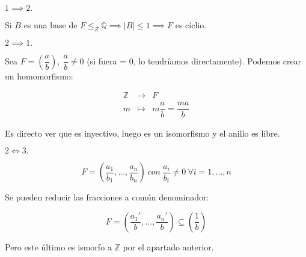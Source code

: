 \documentclass[openany]{book}
\begin{document}
\begin{exercise}
    $ $

    \noindent $ 1\implies 2.$

    Si $ B$ es una base de $ F \leq _{Z}\mathbb{Q} \implies |B| \leq  1 \implies F$ es cíclio.

    \noindent $ 2 \implies 1.$

    Sea $ F = \left(\dfrac{a}{b}\right),\ \dfrac{a}{b} \ne 0$ (si fuera = 0, lo tendríamos directamente). Podemos crear un homomorfismo:

    $$ 
    \begin{aligned}
        \mathbb{Z} &  \to &  F\\ 
        m & \mapsto & m \dfrac{a}{b} = \dfrac{ma}{b}
    \end{aligned}
    $$

    Es directo ver que es inyectivo, luego es un isomorfismo y el anillo es libre.

    \noindent $ 2\iff 3.$

    $$ F = \left( \dfrac{a_1}{b_1},..., \dfrac{a_n}{b_n} \right)\  con\ \dfrac{a_i}{b_i} \ne 0 \ \forall i = 1,...,n $$

    Se pueden reducir las fracciones a común denominador:

    $$ F = \left( \dfrac{a_1'}{b},...,\dfrac{a_n'}{b} \right) \subseteq  \left(\dfrac{1}{b}\right) $$

    Pero este último es ismorfo a $ \mathbb{Z}$ por el apartado anterior.

\end{exercise}
\end{document}
